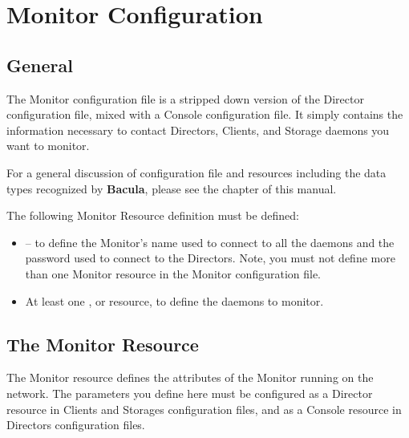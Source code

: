 
\section*{Monitor Configuration}
\label{_ChapterStart35}

\subsection*{General}

The Monitor configuration file is a stripped down version of the Director
configuration file, mixed with a Console configuration file. It simply
contains the information necessary to contact Directors, Clients, and Storage
daemons you want to monitor. 

For a general discussion of configuration file and resources including the
data types recognized by {\bf Bacula}, please see the 
 chapter of this manual. 

The following Monitor Resource definition must be defined: 

\begin{itemize}
\item 
    -- to  define the Monitor's
   name used to connect to all the daemons and  the password used to connect to
the Directors. Note, you must not  define more than one Monitor resource in
the  Monitor configuration file.  
\item At least one 
   ,  
    or  
 resource, to define the 
daemons to monitor. 
\end{itemize}

\subsection*{The Monitor Resource}
\label{MonitorResource}

The Monitor resource defines the attributes of the Monitor running on the
network. The parameters you define here must be configured as a Director
resource in Clients and Storages configuration files, and as a Console
resource in Directors configuration files. 

